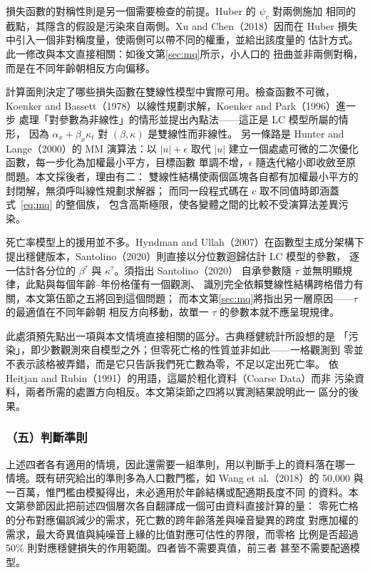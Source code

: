 \documentclass[UTF8, fontset=macnew, a4paper, 12pt]{ctexart}
\begin{document}
損失函數的對稱性則是另一個需要檢查的前提。Huber 的 $\psi_c$ 對兩側施加
相同的截點，其隱含的假設是污染來自兩側。Xu and Chen（2018）因而在
Huber 損失中引入一個非對稱度量，使兩側可以帶不同的權重，並給出該度量的
估計方式。此一修改與本文直接相關：如後文第\ref{sec:mq}所示，小人口的
扭曲並非兩側對稱，而是在不同年齡朝相反方向偏移。

計算面則決定了哪些損失函數在雙線性模型中實際可用。檢查函數不可微，
Koenker and Bassett（1978）以線性規劃求解，Koenker and Park（1996）進一步
處理「對參數為非線性」的情形並提出內點法——這正是 LC 模型所屬的情形，
因為 $\alpha_x+\beta_x\kappa_t$ 對 $(\beta,\kappa)$ 是雙線性而非線性。
另一條路是 Hunter and Lange（2000）的 MM 演算法：以 $|u|+\epsilon$ 取代
$|u|$ 建立一個處處可微的二次優化函數，每一步化為加權最小平方，目標函數
單調不增，$\epsilon$ 隨迭代縮小即收斂至原問題。本文採後者，理由有二：
雙線性結構使兩個區塊各自都有加權最小平方的封閉解，無須呼叫線性規劃求解器；
而同一段程式碼在 $c$ 取不同值時即涵蓋式~\eqref{eq:mq} 的整個族，
包含高斯極限，使各變體之間的比較不受演算法差異污染。

死亡率模型上的援用並不多。Hyndman and Ullah（2007）在函數型主成分架構下
提出穩健版本，Santolino（2020）則直接以分位數迴歸估計 LC 模型的參數，
逐一估計各分位的 $\beta^\tau$ 與 $\kappa^\tau$。須指出 Santolino（2020）
自承參數隨 $\tau$ 並無明顯規律，此點與每個年齡--年份格僅有一個觀測、
識別完全依賴雙線性結構跨格借力有關，本文第伍節之五將回到這個問題；
而本文第\ref{sec:mq}將指出另一層原因——$\tau$ 的最適值在不同年齡朝
相反方向移動，故單一 $\tau$ 的參數本就不應呈現規律。

此處須預先點出一項與本文情境直接相關的區分。古典穩健統計所設想的是
「污染」，即少數觀測來自模型之外；但零死亡格的性質並非如此——一格觀測到
零並不表示該格被弄錯，而是它只告訴我們死亡數為零，不足以定出死亡率。
依 Heitjan and Rubin（1991）的用語，這屬於粗化資料（Coarse Data）而非
污染資料，兩者所需的處置方向相反。本文第柒節之四將以實測結果說明此一
區分的後果。

\subsubsection{（五）判斷準則}

上述四者各有適用的情境，因此還需要一組準則，用以判斷手上的資料落在哪一
情境。既有研究給出的準則多為人口數門檻，如 Wang et al.（2018）的
50{,}000 與一百萬，惟門檻由模擬得出，未必適用於年齡結構或配適期長度不同
的資料。本文第參節因此把前述四個層次各自翻譯成一個可由資料直接計算的量：
零死亡格的分布對應偏誤減少的需求，死亡數的跨年齡落差與噪音變異的跨度
對應加權的需求，最大奇異值與純噪音上緣的比值對應可估性的界限，而零格
比例是否超過 50\% 則對應穩健損失的作用範圍。四者皆不需要真值，前三者
甚至不需要配適模型。
\end{document}

